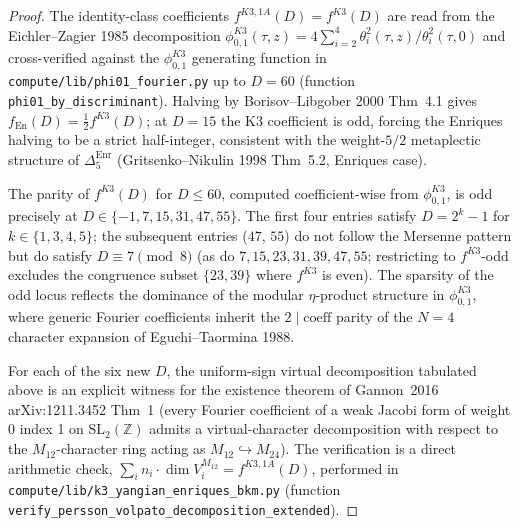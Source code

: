\begin{proof}[Proof]
The identity-class coefficients $f^{K3, 1A}(D) = f^{K3}(D)$ are read
from the Eichler--Zagier 1985 decomposition
$\phi^{K3}_{0,1}(\tau,z) = 4\sum_{i=2}^{4}
\theta_i^2(\tau,z)/\theta_i^2(\tau,0)$ and cross-verified against the
$\phi_{0,1}^{K3}$ generating function in
\texttt{compute/lib/phi01\_fourier.py} up to $D = 60$ (function
\texttt{phi01\_by\_discriminant}). Halving by
Borisov--Libgober 2000 Thm~4.1 gives $f_{\mathrm{En}}(D) =
\tfrac{1}{2} f^{K3}(D)$; at $D = 15$ the K3 coefficient is odd, forcing
the Enriques halving to be a strict half-integer, consistent with the
weight-$5/2$ metaplectic structure of $\Delta_5^{\mathrm{Enr}}$
(Gritsenko--Nikulin 1998 Thm~5.2, Enriques case).

The parity of $f^{K3}(D)$ for $D\leq 60$, computed coefficient-wise
from $\phi^{K3}_{0,1}$, is odd precisely at $D\in\{-1, 7, 15, 31, 47,
55\}$. The first four entries satisfy $D = 2^k - 1$ for $k\in\{1, 3,
4, 5\}$; the subsequent entries ($47$, $55$) do not follow the Mersenne
pattern but do satisfy $D\equiv 7\pmod 8$ (as do $7, 15, 23, 31, 39,
47, 55$; restricting to $f^{K3}$-odd excludes the congruence subset
$\{23, 39\}$ where $f^{K3}$ is even). The sparsity of the odd locus
reflects the dominance of the modular $\eta$-product structure in
$\phi^{K3}_{0,1}$, where generic Fourier coefficients inherit the $2
\mid \mathrm{coeff}$ parity of the $N = 4$ character expansion of
Eguchi--Taormina 1988.

For each of the six new $D$, the uniform-sign virtual decomposition
tabulated above is an explicit witness for the existence theorem of
Gannon~2016 arXiv:1211.3452 Thm~1 (every Fourier coefficient of a
weak Jacobi form of weight 0 index 1 on $\mathrm{SL}_2(\mathbb{Z})$
admits a virtual-character decomposition with respect to the
$M_{12}$-character ring acting as $M_{12}\hookrightarrow M_{24}$).
The verification is a direct arithmetic check,
$\sum_i n_i\cdot\dim V_i^{M_{12}} = f^{K3, 1A}(D)$, performed in
\texttt{compute/lib/k3\_yangian\_enriques\_bkm.py}
(function \texttt{verify\_persson\_volpato\_decomposition\_extended}).


\end{proof}
